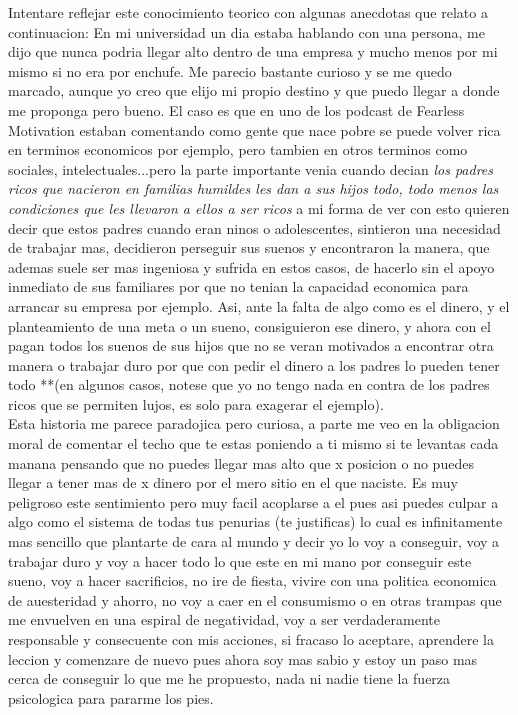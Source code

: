 Intentare reflejar este conocimiento teorico con algunas anecdotas que relato a continuacion: En mi universidad un dia estaba hablando con una persona, me dijo que nunca podria llegar alto dentro de una empresa y mucho menos por mi mismo si no era por enchufe. Me parecio bastante curioso y se me quedo marcado, aunque yo creo que elijo mi propio destino y que puedo llegar a donde me proponga pero bueno. El caso es que en uno de los podcast de Fearless Motivation estaban comentando como gente que nace pobre se puede volver rica en terminos economicos por ejemplo, pero tambien en otros terminos como sociales, intelectuales...pero la parte importante venia cuando decian \textit{los padres ricos que nacieron en familias humildes les dan a sus hijos todo, todo menos las condiciones que les llevaron a ellos a ser ricos} a mi forma de ver con esto quieren decir que estos padres cuando eran ninos o adolescentes, sintieron una necesidad de trabajar mas, decidieron perseguir sus suenos y encontraron la manera, que ademas suele ser mas ingeniosa y sufrida en estos casos, de hacerlo sin el apoyo inmediato de sus familiares por que no tenian la capacidad economica para arrancar su empresa por ejemplo. Asi, ante la falta de algo como es el dinero, y el planteamiento de una meta o un sueno, consiguieron ese dinero, y ahora con el pagan todos los suenos de sus hijos que no se veran motivados a encontrar otra manera o trabajar duro por que con pedir el dinero a los padres lo pueden tener todo **(en algunos casos, notese que yo no tengo nada en contra de los padres ricos que se permiten lujos, es solo para exagerar el ejemplo).\\

Esta historia me parece paradojica pero curiosa, a parte me veo en la obligacion moral de comentar el techo que te estas poniendo a ti mismo si te levantas cada manana pensando que no puedes llegar mas alto que x posicion o no puedes llegar a tener mas de x dinero por el mero sitio en el que naciste. Es muy peligroso este sentimiento pero muy facil acoplarse a el pues asi puedes culpar a algo como el sistema de todas tus penurias (te justificas) lo cual es infinitamente mas sencillo que plantarte de cara al mundo y decir yo lo voy a conseguir, voy a trabajar duro y voy a hacer todo lo que este en mi mano por conseguir este sueno, voy a hacer sacrificios, no ire de fiesta, vivire con una politica economica de auesteridad y ahorro, no voy a caer en el consumismo o en otras trampas que me envuelven en una espiral de negatividad, voy a ser verdaderamente responsable y consecuente con mis acciones, si fracaso lo aceptare, aprendere la leccion y comenzare de nuevo pues ahora soy mas sabio y estoy un paso mas cerca de conseguir lo que me he propuesto, nada ni nadie tiene la fuerza psicologica para pararme los pies.



